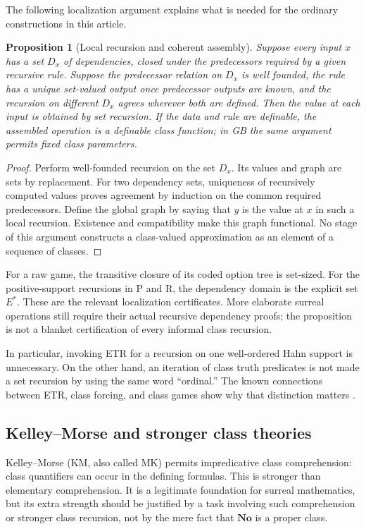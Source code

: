 \documentclass[11pt,letterpaper]{article}
\numberwithin{equation}{section}
\newtheorem{proposition}[theorem]{Proposition}
\theoremstyle{definition}
\theoremstyle{remark}
\newcommand{\No}{\mathbf{No}}
\begin{document}
The following localization argument explains what is needed for the ordinary constructions in this article.
\begin{proposition}[Local recursion and coherent assembly]\label{prop:recursion}
Suppose every input $x$ has a set $D_x$ of dependencies, closed under the predecessors required by a given recursive rule. Suppose the predecessor relation on $D_x$ is well founded, the rule has a unique set-valued output once predecessor outputs are known, and the recursion on different $D_x$ agrees wherever both are defined. Then the value at each input is obtained by set recursion. If the data and rule are definable, the assembled operation is a definable class function; in GB the same argument permits fixed class parameters.
\end{proposition}
\begin{proof}
Perform well-founded recursion on the set $D_x$. Its values and graph are sets by replacement. For two dependency sets, uniqueness of recursively computed values proves agreement by induction on the common required predecessors. Define the global graph by saying that $y$ is the value at $x$ in such a local recursion. Existence and compatibility make this graph functional. No stage of this argument constructs a class-valued approximation as an element of a sequence of classes.
\end{proof}
For a raw game, the transitive closure of its coded option tree is set-sized. For the positive-support recursions in P and R, the dependency domain is the explicit set $E^*$. These are the relevant localization certificates. More elaborate surreal operations still require their actual recursive dependency proofs; the proposition is not a blanket certification of every informal class recursion.

In particular, invoking ETR for a recursion on one well-ordered Hahn support is unnecessary. On the other hand, an iteration of class truth predicates is not made a set recursion by using the same word ``ordinal.'' The known connections between ETR, class forcing, and class games show why that distinction matters \cite{ClassForcing,GitmanHamkins}.

\subsection{Kelley--Morse and stronger class theories}
Kelley--Morse (KM, also called MK) permits impredicative class comprehension: class quantifiers can occur in the defining formulas. This is stronger than elementary comprehension. It is a legitimate foundation for surreal mathematics, but its extra strength should be justified by a task involving such comprehension or stronger class recursion, not by the mere fact that $\No$ is a proper class.
\end{document}
